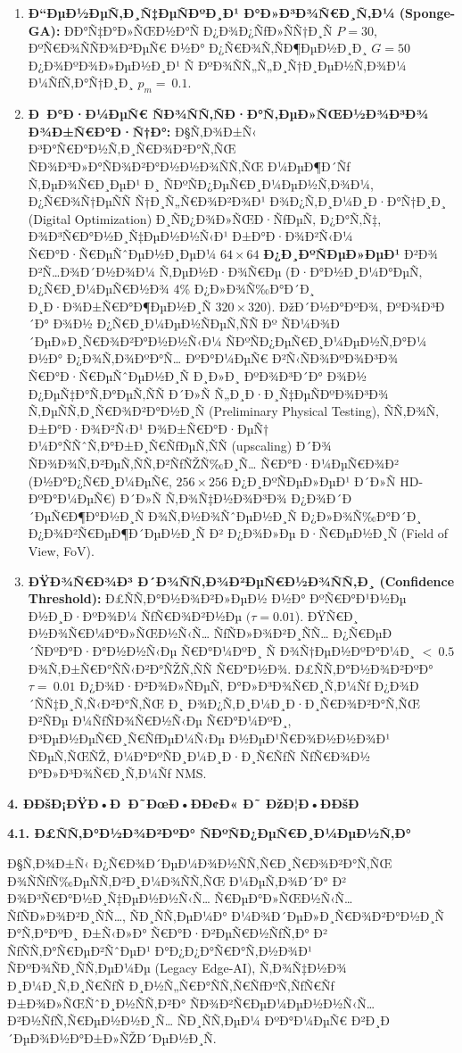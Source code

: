 \documentclass[]{article}
\begin{document}
\begin{enumerate}
\def\labelenumi{\arabic{enumi}.}
\item
  \textbf{Ð“ÐµÐ½ÐµÑ‚Ð¸Ñ‡ÐµÑÐºÐ¸Ð¹ Ð°Ð»Ð³Ð¾Ñ€Ð¸Ñ‚Ð¼ (Sponge-GA):} ÐÐ°Ñ‡Ð°Ð»ÑŒÐ½Ð°Ñ Ð¿Ð¾Ð¿ÑƒÐ»ÑÑ†Ð¸Ñ \(P = 30\), ÐºÑ€Ð¾ÑÑÐ¾Ð²ÐµÑ€ Ð½Ð° Ð¿Ñ€Ð¾Ñ‚ÑÐ¶ÐµÐ½Ð¸Ð¸ \(G = 50\) Ð¿Ð¾ÐºÐ¾Ð»ÐµÐ½Ð¸Ð¹ Ñ ÐºÐ¾ÑÑ„Ñ„Ð¸Ñ†Ð¸ÐµÐ½Ñ‚Ð¾Ð¼ Ð¼ÑƒÑ‚Ð°Ñ†Ð¸Ð¸ \(p_{m} = \ 0.1\).
\item
  \textbf{Ð Ð°Ð·Ð¼ÐµÑ€ ÑÐ¾ÑÑ‚ÑÐ·Ð°Ñ‚ÐµÐ»ÑŒÐ½Ð¾Ð³Ð¾ Ð¾Ð±Ñ€Ð°Ð·Ñ†Ð°:} Ð§Ñ‚Ð¾Ð±Ñ‹ Ð³Ð°Ñ€Ð°Ð½Ñ‚Ð¸Ñ€Ð¾Ð²Ð°Ñ‚ÑŒ ÑÐ¾Ð³Ð»Ð°ÑÐ¾Ð²Ð°Ð½Ð½Ð¾ÑÑ‚ÑŒ Ð¼ÐµÐ¶Ð´Ñƒ Ñ‚ÐµÐ¾Ñ€Ð¸ÐµÐ¹ Ð¸ ÑÐºÑÐ¿ÐµÑ€Ð¸Ð¼ÐµÐ½Ñ‚Ð¾Ð¼, Ð¿Ñ€Ð¾Ñ†ÐµÑÑ Ñ†Ð¸Ñ„Ñ€Ð¾Ð²Ð¾Ð¹ Ð¾Ð¿Ñ‚Ð¸Ð¼Ð¸Ð·Ð°Ñ†Ð¸Ð¸ (Digital Optimization) Ð¸ÑÐ¿Ð¾Ð»ÑŒÐ·ÑƒÐµÑ‚ Ð¿Ð°Ñ‚Ñ‡, Ð¾Ð³Ñ€Ð°Ð½Ð¸Ñ‡ÐµÐ½Ð½Ñ‹Ð¹ Ð±Ð°Ð·Ð¾Ð²Ñ‹Ð¼ Ñ€Ð°Ð·Ñ€ÐµÑˆÐµÐ½Ð¸ÐµÐ¼ \(64 \times 64\) \textbf{Ð¿Ð¸ÐºÑÐµÐ»ÐµÐ¹} Ð²Ð¾ Ð²Ñ…Ð¾Ð´Ð½Ð¾Ð¼ Ñ‚ÐµÐ½Ð·Ð¾Ñ€Ðµ (Ð·Ð°Ð½Ð¸Ð¼Ð°ÐµÑ‚ Ð¿Ñ€Ð¸Ð¼ÐµÑ€Ð½Ð¾ 4\% Ð¿Ð»Ð¾Ñ‰Ð°Ð´Ð¸ Ð¸Ð·Ð¾Ð±Ñ€Ð°Ð¶ÐµÐ½Ð¸Ñ \(320 \times 320\)). ÐžÐ´Ð½Ð°ÐºÐ¾, ÐºÐ¾Ð³Ð´Ð° Ð¾Ð½ Ð¿Ñ€Ð¸Ð¼ÐµÐ½ÑÐµÑ‚ÑÑ Ðº ÑÐ¼Ð¾Ð´ÐµÐ»Ð¸Ñ€Ð¾Ð²Ð°Ð½Ð½Ñ‹Ð¼ ÑÐºÑÐ¿ÐµÑ€Ð¸Ð¼ÐµÐ½Ñ‚Ð°Ð¼ Ð½Ð° Ð¿Ð¾Ñ‚Ð¾ÐºÐ°Ñ… ÐºÐ°Ð¼ÐµÑ€ Ð²Ñ‹ÑÐ¾ÐºÐ¾Ð³Ð¾ Ñ€Ð°Ð·Ñ€ÐµÑˆÐµÐ½Ð¸Ñ Ð¸Ð»Ð¸ ÐºÐ¾Ð³Ð´Ð° Ð¾Ð½ Ð¿ÐµÑ‡Ð°Ñ‚Ð°ÐµÑ‚ÑÑ Ð´Ð»Ñ Ñ„Ð¸Ð·Ð¸Ñ‡ÐµÑÐºÐ¾Ð³Ð¾ Ñ‚ÐµÑÑ‚Ð¸Ñ€Ð¾Ð²Ð°Ð½Ð¸Ñ (Preliminary Physical Testing), ÑÑ‚Ð¾Ñ‚ Ð±Ð°Ð·Ð¾Ð²Ñ‹Ð¹ Ð¾Ð±Ñ€Ð°Ð·ÐµÑ† Ð¼Ð°ÑÑˆÑ‚Ð°Ð±Ð¸Ñ€ÑƒÐµÑ‚ÑÑ (upscaling) Ð´Ð¾ ÑÐ¾Ð¾Ñ‚Ð²ÐµÑ‚ÑÑ‚Ð²ÑƒÑŽÑ‰Ð¸Ñ… Ñ€Ð°Ð·Ð¼ÐµÑ€Ð¾Ð² (Ð½Ð°Ð¿Ñ€Ð¸Ð¼ÐµÑ€, \(256 \times 256\) Ð¿Ð¸ÐºÑÐµÐ»ÐµÐ¹ Ð´Ð»Ñ HD-ÐºÐ°Ð¼ÐµÑ€) Ð´Ð»Ñ Ñ‚Ð¾Ñ‡Ð½Ð¾Ð³Ð¾ Ð¿Ð¾Ð´Ð´ÐµÑ€Ð¶Ð°Ð½Ð¸Ñ Ð¾Ñ‚Ð½Ð¾ÑˆÐµÐ½Ð¸Ñ Ð¿Ð»Ð¾Ñ‰Ð°Ð´Ð¸ Ð¿Ð¾Ð²Ñ€ÐµÐ¶Ð´ÐµÐ½Ð¸Ñ Ð² Ð¿Ð¾Ð»Ðµ Ð·Ñ€ÐµÐ½Ð¸Ñ (Field of View, FoV).
\item
  \textbf{ÐŸÐ¾Ñ€Ð¾Ð³ Ð´Ð¾ÑÑ‚Ð¾Ð²ÐµÑ€Ð½Ð¾ÑÑ‚Ð¸ (Confidence Threshold):} Ð£ÑÑ‚Ð°Ð½Ð¾Ð²Ð»ÐµÐ½ Ð½Ð° ÐºÑ€Ð°Ð¹Ð½Ðµ Ð½Ð¸Ð·ÐºÐ¾Ð¼ ÑƒÑ€Ð¾Ð²Ð½Ðµ \((\tau = 0.01\)). ÐŸÑ€Ð¸ Ð½Ð¾Ñ€Ð¼Ð°Ð»ÑŒÐ½Ñ‹Ñ… ÑƒÑÐ»Ð¾Ð²Ð¸ÑÑ… Ð¿Ñ€ÐµÐ´ÑÐºÐ°Ð·Ð°Ð½Ð½Ñ‹Ðµ Ñ€Ð°Ð¼ÐºÐ¸ Ñ Ð¾Ñ†ÐµÐ½ÐºÐ°Ð¼Ð¸ \(< \ 0.5\) Ð¾Ñ‚Ð±Ñ€Ð°ÑÑ‹Ð²Ð°ÑŽÑ‚ÑÑ Ñ€Ð°Ð½Ð¾. Ð£ÑÑ‚Ð°Ð½Ð¾Ð²ÐºÐ° \(\tau = \ 0.01\) Ð¿Ð¾Ð·Ð²Ð¾Ð»ÑÐµÑ‚ Ð°Ð»Ð³Ð¾Ñ€Ð¸Ñ‚Ð¼Ñƒ Ð¿Ð¾Ð´ÑÑ‡Ð¸Ñ‚Ñ‹Ð²Ð°Ñ‚ÑŒ Ð¸ Ð¾Ð¿Ñ‚Ð¸Ð¼Ð¸Ð·Ð¸Ñ€Ð¾Ð²Ð°Ñ‚ÑŒ Ð²ÑÐµ Ð¼ÑƒÑÐ¾Ñ€Ð½Ñ‹Ðµ Ñ€Ð°Ð¼ÐºÐ¸, Ð³ÐµÐ½ÐµÑ€Ð¸Ñ€ÑƒÐµÐ¼Ñ‹Ðµ Ð½ÐµÐ¹Ñ€Ð¾Ð½Ð½Ð¾Ð¹ ÑÐµÑ‚ÑŒÑŽ, Ð¼Ð°ÐºÑÐ¸Ð¼Ð¸Ð·Ð¸Ñ€ÑƒÑ ÑƒÑ€Ð¾Ð½ Ð°Ð»Ð³Ð¾Ñ€Ð¸Ñ‚Ð¼Ñƒ NMS.
\end{enumerate}

\textbf{4. Ð­ÐšÐ¡ÐŸÐ•Ð Ð˜ÐœÐ•ÐÐ¢Ð« Ð˜ ÐžÐ¦Ð•ÐÐšÐ}

\textbf{4.1. Ð£ÑÑ‚Ð°Ð½Ð¾Ð²ÐºÐ° ÑÐºÑÐ¿ÐµÑ€Ð¸Ð¼ÐµÐ½Ñ‚Ð°}

Ð§Ñ‚Ð¾Ð±Ñ‹ Ð¿Ñ€Ð¾Ð´ÐµÐ¼Ð¾Ð½ÑÑ‚Ñ€Ð¸Ñ€Ð¾Ð²Ð°Ñ‚ÑŒ Ð¾ÑÑƒÑ‰ÐµÑÑ‚Ð²Ð¸Ð¼Ð¾ÑÑ‚ÑŒ Ð¼ÐµÑ‚Ð¾Ð´Ð° Ð² Ð¾Ð³Ñ€Ð°Ð½Ð¸Ñ‡ÐµÐ½Ð½Ñ‹Ñ… Ñ€ÐµÐ°Ð»ÑŒÐ½Ñ‹Ñ… ÑƒÑÐ»Ð¾Ð²Ð¸ÑÑ…, ÑÐ¸ÑÑ‚ÐµÐ¼Ð° Ð¼Ð¾Ð´ÐµÐ»Ð¸Ñ€Ð¾Ð²Ð°Ð½Ð¸Ñ Ð°Ñ‚Ð°ÐºÐ¸ Ð±Ñ‹Ð»Ð° Ñ€Ð°Ð·Ð²ÐµÑ€Ð½ÑƒÑ‚Ð° Ð² ÑƒÑÑ‚Ð°Ñ€ÐµÐ²ÑˆÐµÐ¹ Ð°Ð¿Ð¿Ð°Ñ€Ð°Ñ‚Ð½Ð¾Ð¹ ÑÐºÐ¾ÑÐ¸ÑÑ‚ÐµÐ¼Ðµ (Legacy Edge-AI), Ñ‚Ð¾Ñ‡Ð½Ð¾ Ð¸Ð¼Ð¸Ñ‚Ð¸Ñ€ÑƒÑ Ð¸Ð½Ñ„Ñ€Ð°ÑÑ‚Ñ€ÑƒÐºÑ‚ÑƒÑ€Ñƒ Ð±Ð¾Ð»ÑŒÑˆÐ¸Ð½ÑÑ‚Ð²Ð° ÑÐ¾Ð²Ñ€ÐµÐ¼ÐµÐ½Ð½Ñ‹Ñ… Ð²Ð½ÑƒÑ‚Ñ€ÐµÐ½Ð½Ð¸Ñ… ÑÐ¸ÑÑ‚ÐµÐ¼ ÐºÐ°Ð¼ÐµÑ€ Ð²Ð¸Ð´ÐµÐ¾Ð½Ð°Ð±Ð»ÑŽÐ´ÐµÐ½Ð¸Ñ.
\end{document}
